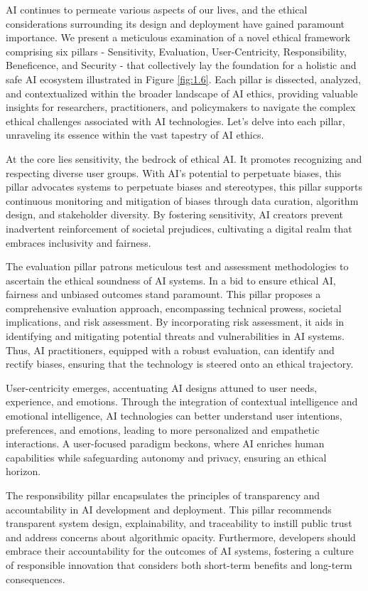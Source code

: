 \documentclass{article}
\begin{document}
AI continues to permeate various aspects of our lives, and the ethical considerations surrounding its design and deployment have gained paramount importance. We present a meticulous examination of a novel ethical framework comprising six pillars - Sensitivity, Evaluation, User-Centricity, Responsibility, Beneficence, and Security - that collectively lay the foundation for a holistic and safe AI ecosystem illustrated in Figure \ref{fig:1.6}. Each pillar is dissected, analyzed, and contextualized within the broader landscape of AI ethics, providing valuable insights for researchers, practitioners, and policymakers to navigate the complex ethical challenges associated with AI technologies. Let's delve into each pillar, unraveling its essence within the vast tapestry of AI ethics.

At the core lies sensitivity, the bedrock of ethical AI. It promotes recognizing and respecting diverse user groups. With AI's potential to perpetuate biases, this pillar advocates systems to perpetuate biases and stereotypes, this pillar supports continuous monitoring and mitigation of biases through data curation, algorithm design, and stakeholder diversity. By fostering sensitivity, AI creators prevent inadvertent reinforcement of societal prejudices, cultivating a digital realm that embraces inclusivity and fairness.

The evaluation pillar patrons meticulous test and assessment methodologies to ascertain the ethical soundness of AI systems. In a bid to ensure ethical AI, fairness and unbiased outcomes stand paramount. This pillar proposes a comprehensive evaluation approach, encompassing technical prowess, societal implications, and risk assessment. By incorporating risk assessment, it aids in identifying and mitigating potential threats and vulnerabilities in AI systems. Thus, AI practitioners, equipped with a robust evaluation, can identify and rectify biases, ensuring that the technology is steered onto an ethical trajectory.

User-centricity emerges, accentuating AI designs attuned to user needs, experience, and emotions. Through the integration of contextual intelligence and emotional intelligence, AI technologies can better understand user intentions, preferences, and emotions, leading to more personalized and empathetic interactions. A user-focused paradigm beckons, where AI enriches human capabilities while safeguarding autonomy and privacy, ensuring an ethical horizon.

The responsibility pillar encapsulates the principles of transparency and accountability in AI development and deployment. This pillar recommends transparent system design, explainability, and traceability to instill public trust and address concerns about algorithmic opacity. Furthermore, developers should embrace their accountability for the outcomes of AI systems, fostering a culture of responsible innovation that considers both short-term benefits and long-term consequences.
\end{document}
